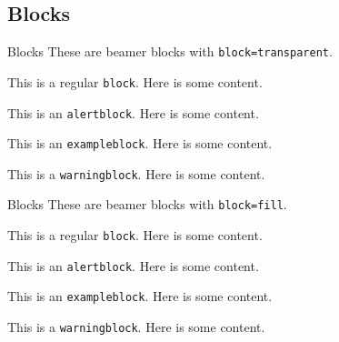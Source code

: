 \documentclass[10pt]{beamer}
\begin{document}
\subsection{Blocks}

{
\begin{frame}[label=blocks]{Blocks}
    These are beamer blocks with \texttt{block=transparent}.\medskip

    \begin{block}{This is a regular \texttt{block}.}
    Here is some content.
    \end{block}

    \begin{alertblock}{This is an \texttt{alertblock}.}
    Here is some content.
    \end{alertblock}

    \begin{exampleblock}{This is an \texttt{exampleblock}.}
    Here is some content.
    \end{exampleblock}

    \begin{warningblock}{This is a \texttt{warningblock}.}
    Here is some content.
    \end{warningblock}
\end{frame}
}

{
\begin{frame}{Blocks}
    These are beamer blocks with \texttt{block=fill}.\medskip

    \begin{block}{This is a regular \texttt{block}.}
    Here is some content.
    \end{block}

    \begin{alertblock}{This is an \texttt{alertblock}.}
    Here is some content.
    \end{alertblock}

    \begin{exampleblock}{This is an \texttt{exampleblock}.}
    Here is some content.
    \end{exampleblock}

    \begin{warningblock}{This is a \texttt{warningblock}.}
    Here is some content.
    \end{warningblock}
\end{frame}
}
\end{document}
